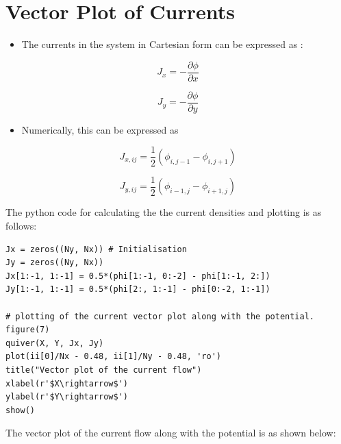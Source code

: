 \documentclass[11pt, a4paper]{article}
\begin{document}
\section{Vector Plot of Currents}

\begin{itemize}
\item
  The currents in the system in Cartesian form can be expressed as :
\end{itemize}

\begin{equation}
    J_x = -\frac{\partial \phi}{\partial x} 
  \end{equation}

\begin{equation}
    J_y = -\frac{\partial \phi}{\partial y} 
  \end{equation}

\begin{itemize}
\item
  Numerically, this can be expressed as
\end{itemize}

\begin{equation}
        J_{x,ij} = \frac{1}{2}(\phi_{i,j-1} - \phi_{i,j+1}) 
    \end{equation}

\begin{equation}
        J_{y,ij} = \frac{1}{2}(\phi_{i-1,j} - \phi_{i+1,j}) 
    \end{equation}
  
The python code for calculating the the current densities and plotting is as follows:
   
  
\begin{verbatim}
Jx = zeros((Ny, Nx)) # Initialisation
Jy = zeros((Ny, Nx))
Jx[1:-1, 1:-1] = 0.5*(phi[1:-1, 0:-2] - phi[1:-1, 2:])
Jy[1:-1, 1:-1] = 0.5*(phi[2:, 1:-1] - phi[0:-2, 1:-1])
 
# plotting of the current vector plot along with the potential.
figure(7)
quiver(X, Y, Jx, Jy)
plot(ii[0]/Nx - 0.48, ii[1]/Ny - 0.48, 'ro')
title("Vector plot of the current flow")
xlabel(r'$X\rightarrow$')
ylabel(r'$Y\rightarrow$')
show()
  \end{verbatim}
The vector plot of the current flow along with the potential is as shown below:
\end{document}
